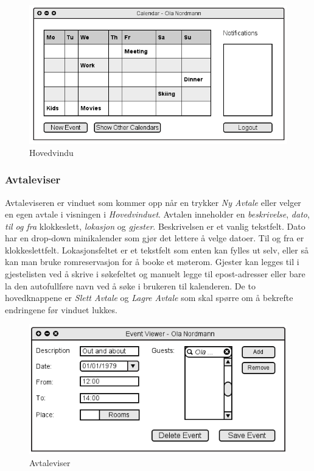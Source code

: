 \begin{figure}[H]
\centering
\includegraphics[scale=0.65]{images/hovedvindu.png}
\caption{Hovedvindu}
\label{hovedvindu_image}
\end{figure}

\subsubsection{Avtaleviser}
Avtaleviseren er vinduet som kommer opp når en trykker \emph{Ny Avtale} eller velger en egen avtale i visningen i \emph{Hovedvinduet}. Avtalen inneholder en \emph{beskrivelse}, \emph{dato}, \emph{til og fra} klokkeslett, \emph{lokasjon} og \emph{gjester}. Beskrivelsen er et vanlig tekstfelt. Dato har en drop-down minikalender som gjør det lettere å velge datoer. Til og fra er klokkeslettfelt. Lokasjonsfeltet er et tekstfelt som enten kan fylles ut selv, eller så kan man bruke romreservasjon for å booke et møterom. Gjester kan legges til i gjestelisten ved å skrive i søkefeltet og manuelt legge til epost-adresser eller bare la den autofullføre navn ved å søke i brukeren til kalenderen. De to hovedknappene er \emph{Slett Avtale} og \emph{Lagre Avtale} som skal spørre om å bekrefte endringene før vinduet lukkes.

\begin{figure}[H]
\centering
\includegraphics[scale=0.65]{images/avtaleviser.png}
\caption{Avtaleviser}
\label{avtaleviser_image}
\end{figure}

